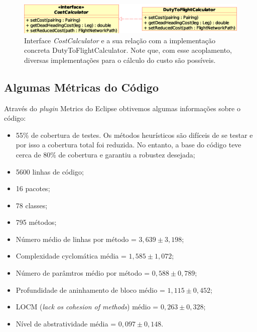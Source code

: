 \begin{figure}[htbp]
	\begin{center}
		\includegraphics[scale=0.65]{fig/cost_calculator.eps}
		\caption{Interface {\it CostCalculator} e a sua relação com a implementação concreta
    DutyToFlightCalculator. Note que, com esse acoplamento, diversas implementações para o cálculo
    do custo são possíveis.}
		\label{fig:cost_interface}
	\end{center}
\end{figure}



\subsection{Algumas Métricas do Código}
\label{sec:metricas}

Através do {\it plugin} Metrics do Eclipse obtivemos algumas informações sobre o código: 

\begin{itemize}
\item 55\% de cobertura de testes. Os métodos heurísticos são difíceis de se testar e por isso a
cobertura total foi reduzida. No entanto, a base do código teve cerca de 80\% de cobertura e 
garantiu a robustez desejada;
\item 5600 linhas de código; 
\item 16 pacotes; 
\item 78 classes; 
\item 795 métodos;
\item Número médio de linhas por método = $3,639 \pm 3,198$;
\item Complexidade cyclomática média = $1,585 \pm 1,072$;
\item Número de parâmtros médio por método = $0,588 \pm 0,789$;
\item Profundidade de aninhamento de bloco médio = $1,115 \pm 0,452$;
\item LOCM ({\it lack os cohesion of methods}) médio = $0,263 \pm 0,328$;
\item Nível de abstratividade média = $0,097 \pm 0,148$.
\end{itemize}

